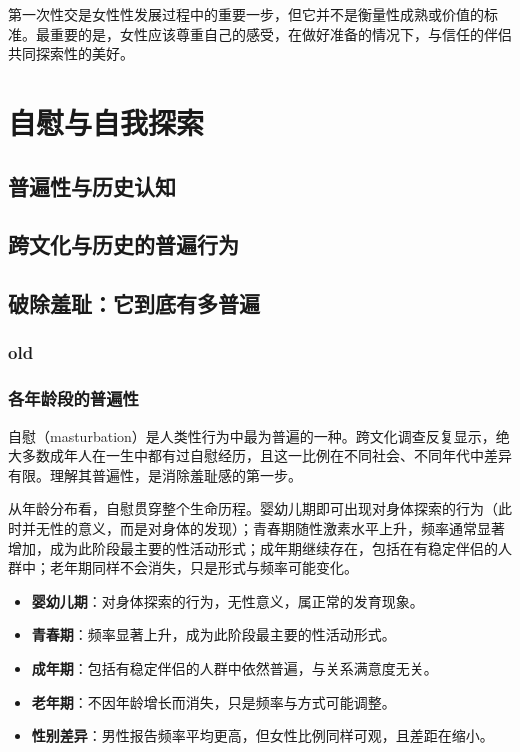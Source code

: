 \documentclass[12pt,UTF8]{ctexbook}
\newcommand{\keyword}[1]{\textbf{#1}}
\begin{document}
第一次性交是女性性发展过程中的重要一步，但它并不是衡量性成熟或价值的标准。最重要的是，女性应该尊重自己的感受，在做好准备的情况下，与信任的伴侣共同探索性的美好。

\chapter{自慰与自我探索}


\section{普遍性与历史认知}

\section{跨文化与历史的普遍行为}

\section{破除羞耻：它到底有多普遍}

\subsection{old}

\subsection{各年龄段的普遍性}

自慰（masturbation）是人类性行为中最为普遍的一种。跨文化调查反复显示，绝大多数成年人在一生中都有过自慰经历，且这一比例在不同社会、不同年代中差异有限。理解其普遍性，是消除羞耻感的第一步。

从年龄分布看，自慰贯穿整个生命历程。婴幼儿期即可出现对身体探索的行为（此时并无性的意义，而是对身体的发现）；青春期随性激素水平上升，频率通常显著增加，成为此阶段最主要的性活动形式；成年期继续存在，包括在有稳定伴侣的人群中；老年期同样不会消失，只是形式与频率可能变化。

\begin{itemize}
	\item \keyword{婴幼儿期}：对身体探索的行为，无性意义，属正常的发育现象。
	\item \keyword{青春期}：频率显著上升，成为此阶段最主要的性活动形式。
	\item \keyword{成年期}：包括有稳定伴侣的人群中依然普遍，与关系满意度无关。
	\item \keyword{老年期}：不因年龄增长而消失，只是频率与方式可能调整。
	\item \keyword{性别差异}：男性报告频率平均更高，但女性比例同样可观，且差距在缩小。
\end{itemize}
\end{document}
